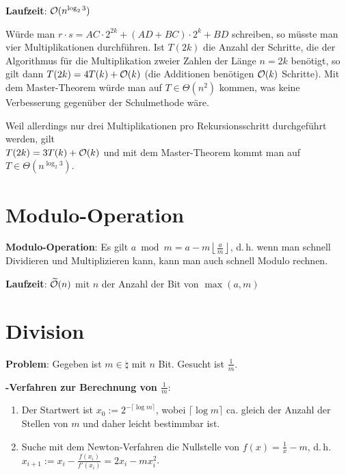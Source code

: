 \textbf{Laufzeit}:
$\mathcal{O}(n^{\log_2 3})$

\begin{Beweis}
    Würde man $r \cdot s = AC \cdot 2^{2k} + (AD + BC) \cdot 2^k + BD$ schreiben,
    so müsste man vier Multiplikationen durchführen.
    Ist $T(2k)$ die Anzahl der Schritte, die der Algorithmus für die Multiplikation zweier
    Zahlen der Länge $n = 2k$ benötigt, so gilt dann
    $T(2k) = 4T(k) + \mathcal{O}(k)$
    (die Additionen benötigen $\mathcal{O}(k)$ Schritte).
    Mit dem Master-Theorem würde man auf $T \in \Theta(n^2)$ kommen, was keine Verbesserung
    gegenüber der Schulmethode wäre.

    Weil allerdings nur drei Multiplikationen pro Rekursionsschritt durchgeführt werden, gilt\\
    $T(2k) = 3T(k) + \mathcal{O}(k)$ und mit dem Master-Theorem kommt man auf
    $T \in \Theta(n^{\log_2 3})$.
\end{Beweis}

\section{%
    Modulo-Operation%
}

\textbf{Modulo-Operation}:
Es gilt $a \bmod m = a - m \left\lfloor\frac{a}{m}\right\rfloor$,
d.\,h. wenn man schnell Dividieren und Multiplizieren kann, kann man auch schnell Modulo rechnen.

\textbf{Laufzeit}:
$\widetilde{\mathcal{O}}(n)$ mit $n$ der Anzahl der Bit von $\max(a, m)$

\pagebreak

\section{%
    Division%
}

\textbf{Problem}:
Gegeben ist $m \in \natural$ mit $n$ Bit.
Gesucht ist $\frac{1}{m}$.

\textbf{-Verfahren zur Berechnung von $\frac{1}{m}$}:
\begin{enumerate}
    \item
    Der Startwert ist $x_0 := 2^{-\lceil\log m \rceil}$,
    wobei $\lceil\log m \rceil$ ca. gleich der Anzahl der Stellen von $m$ und
    daher leicht bestimmbar ist.

    \item
    Suche mit dem Newton-Verfahren die Nullstelle von $f(x) = \frac{1}{x} - m$, d.\,h.\\
    $x_{i+1} := x_i - \frac{f(x_i)}{f'(x_i)} = 2x_i - mx_i^2$.
\end{enumerate}

